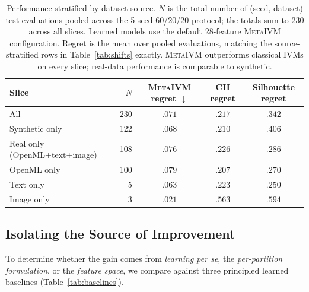 \documentclass[10pt]{article} %
\newcommand{\ours}{\textsc{MetaIVM}}
\begin{document}
\begin{table}[t]
\centering
\caption{Performance stratified by dataset source. $N$ is the total number of (seed, dataset) test evaluations pooled across the 5-seed 60/20/20 protocol; the totals sum to 230 across all slices. Learned models use the default 28-feature \ours{} configuration. Regret is the mean over pooled evaluations, matching the source-stratified rows in Table~\ref{tab:shifts} exactly. \ours{} outperforms classical IVMs on every slice; real-data performance is comparable to synthetic.}
\label{tab:by_source}
\small
\begin{tabular}{lrccc}
\toprule
\textbf{Slice} & $N$ & \textbf{\ours{} regret} $\downarrow$ & \textbf{CH regret} & \textbf{Silhouette regret} \\
\midrule
All & 230 & $\mathbf{.071}$ & $.217$ & $.342$ \\
\midrule
Synthetic only & 122 & $\mathbf{.068}$ & $.210$ & $.406$ \\
Real only (OpenML+text+image) & 108 & $\mathbf{.076}$ & $.226$ & $.286$ \\
\midrule
\hspace{1em}OpenML only & 100 & $\mathbf{.079}$ & $.207$ & $.270$ \\
\hspace{1em}Text only & 5 & $\mathbf{.063}$ & $.223$ & $.250$ \\
\hspace{1em}Image only & 3 & $\mathbf{.021}$ & $.563$ & $.594$ \\
\bottomrule
\end{tabular}
\end{table}

\subsection{Isolating the Source of Improvement}

To determine whether the gain comes from \emph{learning per se}, the \emph{per-partition formulation}, or the \emph{feature space}, we compare against three principled learned baselines (Table~\ref{tab:baselines}).
\end{document}
